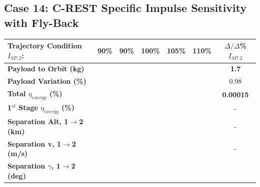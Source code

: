 \subsection{Case 14: C-REST Specific Impulse Sensitivity with Fly-Back}


\begin{table}[ht]
	\centering
	\begin{tabular}{l c c c c c c} 
		\hline \textbf{Trajectory Condition}   \qquad  $I_{SP,2}$:
		&90\%
		&90\%
		&100\%
		&105\%
		&110\%
		& $\Delta/\Delta$\%$I_{SP,2}$
		\\
		\hline \textbf{Payload to Orbit (kg)}
		& \textbf{\PayloadToOrbitIspNinety}
		& \textbf{\PayloadToOrbitIspNinetyFive}
		& \textbf{\PayloadToOrbitIspStandard}
		& \textbf{\PayloadToOrbitIspOneHundredFive}
		& \textbf{\PayloadToOrbitIspOneHundredTen}
		&\textbf{1.7}
		\\
		\textbf{Payload Variation (\%)}
		& \PayloadVarIspNinety
		& \PayloadVarIspNinetyFive
		& \PayloadVarIspStandard
		& \PayloadVarIspOneHundredFive
		& \PayloadVarIspOneHundredTen
		&0.98
		\\
		\textbf{Total $\eta_{exergy}$ (\%)}
		& \textbf{\totalExergyEffIspNinety}
		& \textbf{\totalExergyEffIspNinetyFive}
		& \textbf{\totalExergyEffIspStandard}
		& \textbf{\totalExergyEffIspOneHundredFive}
		& \textbf{\totalExergyEffIspOneHundredTen}
		& \textbf{0.00015}
		\\
		\hline 
		\textbf{1$^{st}$ Stage $\eta_{exergy}$ (\%)}
		& \textbf{\firstExergyEffIspNinety}
		& \textbf{\firstExergyEffIspNinetyFive}
		& \textbf{\firstExergyEffIspStandard}
		& \textbf{\firstExergyEffIspOneHundredFive}
		& \textbf{\firstExergyEffIspOneHundredTen}
		& -
		\\
		\textbf{Separation Alt, 1$\rightarrow$2 (km)}
		& \firstsecondSeparationAltIspNinety
		& \firstsecondSeparationAltIspNinetyFive
		& \firstsecondSeparationAltIspStandard
		& \firstsecondSeparationAltIspOneHundredFive
		& \firstsecondSeparationAltIspOneHundredTen
		& -
		\\
		\textbf{Separation v, 1$\rightarrow$2 (m/s)}
		& \firstsecondSeparationvIspNinety
		& \firstsecondSeparationvIspNinetyFive
		& \firstsecondSeparationvIspStandard
		& \firstsecondSeparationvIspOneHundredFive
		& \firstsecondSeparationvIspOneHundredTen
		& -
		\\
		\textbf{Separation $\gamma$, 1$\rightarrow$2 (deg)}
		& \firstsecondSeparationgammaIspNinety
		& \firstsecondSeparationgammaIspNinetyFive
		& \firstsecondSeparationgammaIspStandard
		& \firstsecondSeparationgammaIspOneHundredFive

\end{tabular}
\end{table}
